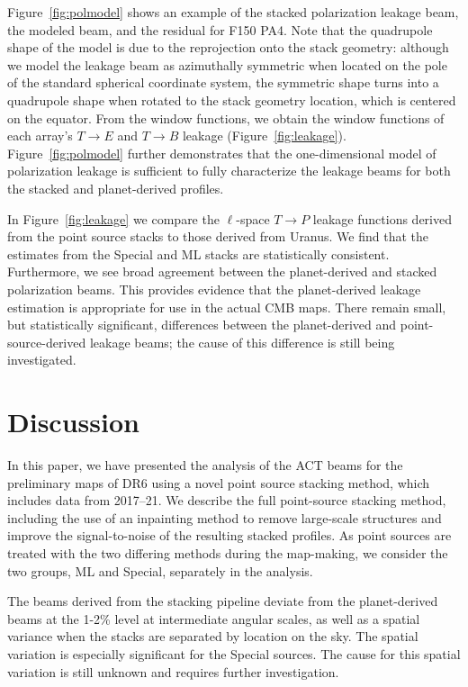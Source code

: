 Figure~\ref{fig:polmodel} shows an example of the stacked polarization leakage beam, the modeled beam, and the residual for F150 PA4. Note that the quadrupole shape of the model is due to the reprojection onto the stack geometry: although we model the leakage beam as azimuthally symmetric when located on the pole of the standard spherical coordinate system, the symmetric shape turns into a quadrupole shape when rotated to the stack geometry location, which is centered on the equator. From the window functions, we obtain the window functions of each array's $T\rightarrow E$ and $T\rightarrow B$ leakage (Figure~\ref{fig:leakage}).  Figure~\ref{fig:polmodel} further demonstrates that the one-dimensional model of polarization leakage is sufficient to fully characterize the leakage beams for both the stacked and planet-derived profiles.

In Figure~\ref{fig:leakage} we compare the $\ell$-space $T\rightarrow P$ leakage functions derived from the point source stacks to those derived from Uranus. We find that the estimates from the Special and ML stacks are statistically consistent. Furthermore, we see broad agreement between the planet-derived and stacked polarization beams.  This provides evidence that the planet-derived leakage estimation is appropriate for use in the actual CMB maps. There remain small, but statistically significant, differences between the planet-derived and point-source-derived leakage beams; the cause of this difference is still being investigated.

\section{Discussion}
\label{sec:act_disc}
In this paper, we have presented the analysis of the ACT beams for the preliminary maps of DR6 using a novel point source stacking method, which includes data from 2017--21.  We describe the full point-source stacking method, including the use of an inpainting method to remove large-scale structures and improve the signal-to-noise of the resulting stacked profiles.  As point sources are treated with the two differing methods during the map-making, we consider the two groups, ML and Special, separately in the analysis.

The beams derived from the stacking pipeline deviate from the planet-derived beams at the 1-2\% level at intermediate angular scales, as well as a spatial variance when the stacks are separated by location on the sky.  The spatial variation is especially significant for the Special sources. The cause for this spatial variation is still unknown and requires further investigation.

